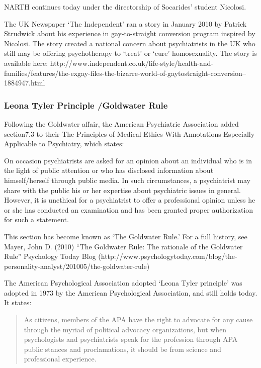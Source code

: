 NARTH continues today under the directorship of Socarides' student Nicolosi.

The UK Newspaper `The Independent' ran a story in January 2010 by Patrick Strudwick about his experience in gay-to-straight conversion program inspired by Nicolosi. The story created a national concern about psychiatrists in the UK who still may be offering psychotherapy to `treat' or `cure' homosexuality. The story is available here: http:\slash \slash www.independent.co.uk\slash life-style\slash health-and-families\slash features\slash the-exgay-files-the-bizarre-world-of-gaytostraight-conversion--1884947.html

\subsubsection{Leona Tyler Principle \slash  Goldwater Rule}
\label{leonatylerprinciplegoldwaterrule}

Following the Goldwater affair, the American Psychiatric Association added section7.3 to their The Principles of Medical Ethics With Annotations Especially Applicable to Psychiatry, which states:

On occasion psychiatrists are asked for an opinion about an individual who is in the light of public attention or who has disclosed information about himself\slash herself through public media. In such circumstances, a psychiatrist may share with the public his or her expertise about psychiatric issues in general. However, it is unethical for a psychiatrist to offer a professional opinion unless he or she has conducted an examination and has been granted proper authorization for such a statement.

This section has become known as `The Goldwater Rule.' For a full history, see Mayer, John D. (2010) “The Goldwater Rule: The rationale of the Goldwater Rule” Psychology Today Blog (http:\slash \slash www.psychologytoday.com\slash blog\slash the-personality-analyst\slash 201005\slash the-goldwater-rule)

The American Psychological Association adopted `Leona Tyler principle' was adopted in 1973 by the American Psychological Association, and still holds today. It states:

\begin{quote}

As citizens, members of the APA have the right to advocate for any cause through the myriad of political advocacy organizations, but when psychologists and psychiatrists speak for the profession through APA public stances and proclamations, it should be from science and professional experience. 
\end{quote}

